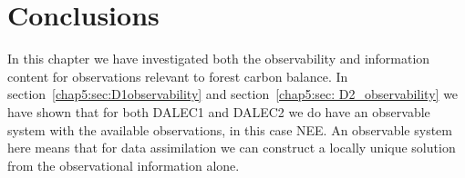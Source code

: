 


\section{Conclusions}

In this chapter we have investigated both the observability and information content for observations relevant to forest carbon balance. In section~\ref{chap5:sec:D1observability} and section~\ref{chap5:sec: D2_observability} we have shown that for both DALEC1 and DALEC2 we do have an observable system with the available observations, in this case NEE. An observable system here means that for data assimilation we can construct a locally unique solution from the observational information alone. 

